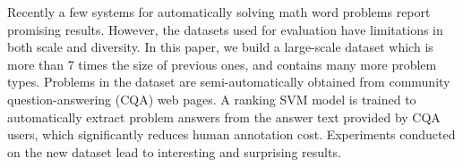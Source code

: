 Recently a few systems for automatically solving math word problems report promising results. However, the datasets used for evaluation have limitations in both scale and diversity. In this paper, we build a large-scale dataset which is more than 7 times the size of previous ones, and contains many more problem types. Problems in the dataset are semi-automatically obtained from community question-answering (CQA) web pages. A ranking SVM model is trained to automatically extract problem answers from the answer text provided by CQA users, which significantly reduces human annotation cost. Experiments conducted on the new dataset lead to interesting and surprising results.
